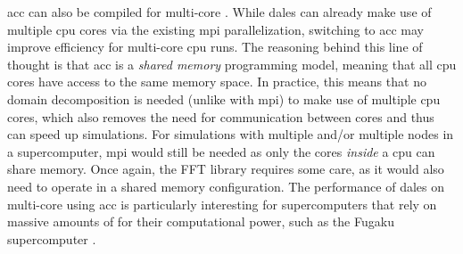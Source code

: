 \acrshort{acc} can also be compiled for multi-core . While \acrshort{dales} can already make use of multiple \acrshort{cpu} cores via the existing \acrshort{mpi} parallelization, switching to \acrshort{acc} may improve efficiency for multi-core \acrshort{cpu} runs. The reasoning behind this line of thought is that \acrshort{acc} is a \emph{shared memory} programming model, meaning that all \acrshort{cpu} cores have access to the same memory space. In practice, this means that no domain decomposition is needed (unlike with \acrshort{mpi}) to make use of multiple \acrshort{cpu} cores, which also removes the need for communication between cores and thus can speed up simulations. For simulations with multiple  and/or multiple nodes in a supercomputer, \acrshort{mpi} would still be needed as only the cores \emph{inside} a \acrshort{cpu} can share memory. Once again, the FFT library requires some care, as it would also need to operate in a shared memory configuration. The performance of \acrshort{dales} on multi-core  using \acrshort{acc} is particularly interesting for supercomputers that rely on massive amounts of  for their computational power, such as the Fugaku supercomputer \citep{satoCoDesignA64FXManycore2020}.
